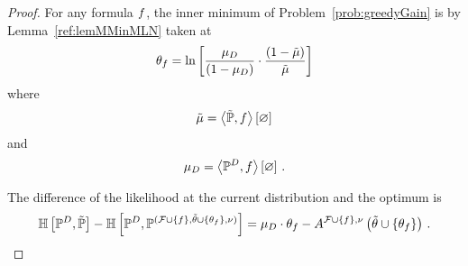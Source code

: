 \begin{proof}
	For any formula $f$, the inner minimum of Problem~\eqref{prob:greedyGain} is by Lemma~\ref{ref:lemMMinMLN} taken at 
		\[ \theta_{f} = \ln \left[ \frac{\mu_{D}}{(1-\mu_{D})}\cdot \frac{(1-\tilde{\mu})}{\tilde{\mu}} \right]  \]
	where
		\[ \tilde{\mu} = \left\langle \tilde{\mathbb{P}},f\right\rangle \left[ \varnothing \right] \]
	and
		\[ \mu_{D} = \left\langle \mathbb{P}^{D},f\right\rangle \left[ \varnothing \right] \, . \]
	
	The difference of the likelihood at the current distribution and the optimum is
	\begin{align*}
		\mathbb{H}\left[\mathbb{P}^{D},\tilde{\mathbb{P}}\right]
		- \mathbb{H}\left[\mathbb{P}^{D},\mathbb{P}^{(\mathcal{F}\cup\{f\},\tilde{\theta}\cup\{\theta_{f}\},\nu)}\right]
		= \mu_{D} \cdot \theta_{f} - A^{\mathcal{F}\cup\{f\},\nu}\left(\tilde{\theta}\cup\{\theta_{f}\}\right) \, .
	\end{align*}
	

\end{proof}
